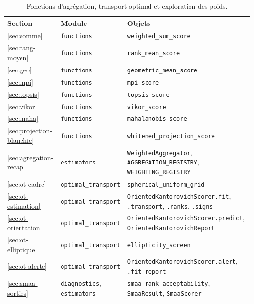 \documentclass[11pt,a4paper]{article}
\theoremstyle{definition}
\theoremstyle{remark}
\begin{document}
\bigskip

\begin{table}[htbp]
  \centering
  \small
  \renewcommand{\arraystretch}{1.2}
  \begin{tabularx}{\textwidth}{@{}l l Y@{}}
    \toprule
    \textbf{Section} & \textbf{Module} & \textbf{Objets} \\
    \midrule
    \ref{sec:somme} & \texttt{functions} & \texttt{weighted\_sum\_score} \\
    \ref{sec:rang-moyen} & \texttt{functions} & \texttt{rank\_mean\_score} \\
    \ref{sec:geo} & \texttt{functions} & \texttt{geometric\_mean\_score} \\
    \ref{sec:mpi} & \texttt{functions} & \texttt{mpi\_score} \\
    \ref{sec:topsis} & \texttt{functions} & \texttt{topsis\_score} \\
    \ref{sec:vikor} & \texttt{functions} & \texttt{vikor\_score} \\
    \ref{sec:maha} & \texttt{functions} & \texttt{mahalanobis\_score} \\
    \ref{sec:projection-blanchie} & \texttt{functions}
      & \texttt{whitened\_projection\_score} \\
    \ref{sec:agregation-recap} & \texttt{estimators}
      & \texttt{WeightedAggregator}, \texttt{AGGREGATION\_REGISTRY},
        \texttt{WEIGHTING\_REGISTRY} \\
    \addlinespace
    \ref{sec:ot-cadre} & \texttt{optimal\_transport}
      & \texttt{spherical\_uniform\_grid} \\
    \ref{sec:ot-estimation} & \texttt{optimal\_transport}
      & \texttt{OrientedKantorovichScorer.fit}, \texttt{.transport},
        \texttt{.ranks}, \texttt{.signs} \\
    \ref{sec:ot-orientation} & \texttt{optimal\_transport}
      & \texttt{OrientedKantorovichScorer.predict},
        \texttt{OrientedKantorovichReport} \\
    \ref{sec:ot-elliptique} & \texttt{optimal\_transport}
      & \texttt{ellipticity\_screen} \\
    \ref{sec:ot-alerte} & \texttt{optimal\_transport}
      & \texttt{OrientedKantorovichScorer.alert}, \texttt{.fit\_report} \\
    \addlinespace
    \ref{sec:smaa-sorties} & \texttt{diagnostics}, \texttt{estimators}
      & \texttt{smaa\_rank\_acceptability}, \texttt{SmaaResult},
        \texttt{SmaaScorer} \\
    \bottomrule
  \end{tabularx}
  \caption{Fonctions d'agrégation, transport optimal et exploration des poids.}
  \label{tab:code-2}
\end{table}
\end{document}
